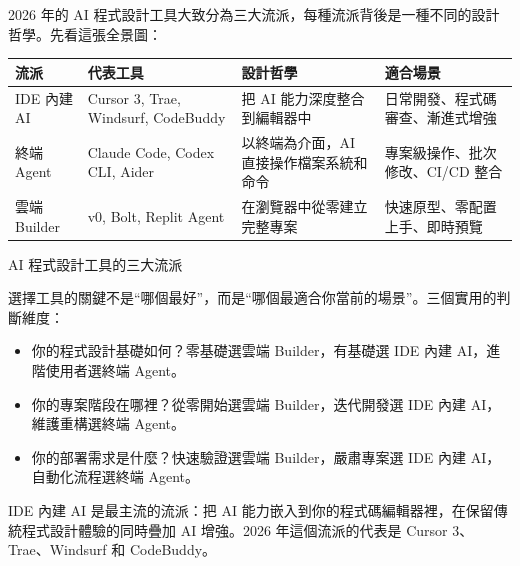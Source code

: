 


2026 年的 AI 程式設計工具大致分為三大流派，每種流派背後是一種不同的設計哲學。先看這張全景圖：

\begin{center}
\begin{tabularx}{\linewidth}{|X|X|X|X|}
\hline
\textbf{流派} & \textbf{代表工具} & \textbf{設計哲學} & \textbf{適合場景} \tabularnewline
\hline
IDE 內建 AI & Cursor 3, Trae, Windsurf, CodeBuddy & 把 AI 能力深度整合到編輯器中 & 日常開發、程式碼審查、漸進式增強 \tabularnewline
終端 Agent & Claude Code, Codex CLI, Aider & 以終端為介面，AI 直接操作檔案系統和命令 & 專案級操作、批次修改、CI/CD 整合 \tabularnewline
雲端 Builder & v0, Bolt, Replit Agent & 在瀏覽器中從零建立完整專案 & 快速原型、零配置上手、即時預覽 \tabularnewline
\hline
\end{tabularx}
\end{center}

\begin{center}\small\color{gray}AI 程式設計工具的三大流派\end{center}

選擇工具的關鍵不是“哪個最好”，而是“哪個最適合你當前的場景”。三個實用的判斷維度：

\begin{itemize}
  \item 你的程式設計基礎如何？零基礎選雲端 Builder，有基礎選 IDE 內建 AI，進階使用者選終端 Agent。
  \item 你的專案階段在哪裡？從零開始選雲端 Builder，迭代開發選 IDE 內建 AI，維護重構選終端 Agent。
  \item 你的部署需求是什麼？快速驗證選雲端 Builder，嚴肅專案選 IDE 內建 AI，自動化流程選終端 Agent。
\end{itemize}


IDE 內建 AI 是最主流的流派：把 AI 能力嵌入到你的程式碼編輯器裡，在保留傳統程式設計體驗的同時疊加 AI 增強。2026 年這個流派的代表是 Cursor 3、Trae、Windsurf 和 CodeBuddy。


